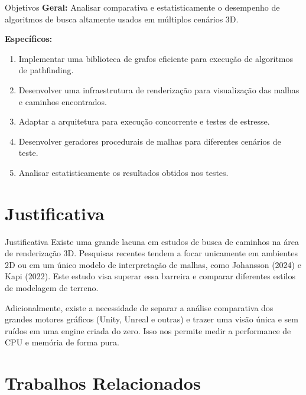 \documentclass[11pt]{beamer}
\begin{document}
\begin{frame}{Objetivos}
    \textbf{Geral:} Analisar comparativa e estatisticamente o desempenho de algoritmos de busca altamente usados em múltiplos cenários 3D.
    \vspace{1.5em}

    \textbf{Específicos:}
    \begin{enumerate}
        \item Implementar uma biblioteca de grafos eficiente para execução de algoritmos de pathfinding.
        \item Desenvolver uma infraestrutura de renderização para visualização das malhas e caminhos encontrados.
        \item Adaptar a arquitetura para execução concorrente e testes de estresse.
        \item Desenvolver geradores procedurais de malhas para diferentes cenários de teste.
        \item Analisar estatisticamente os resultados obtidos nos testes.
    \end{enumerate}
\end{frame}

\section{Justificativa}

\begin{frame}{Justificativa}
    Existe uma grande lacuna em estudos de busca de caminhos na área de renderização 3D. Pesquisas recentes tendem a focar unicamente em ambientes 2D ou em um único modelo de interpretação de malhas, como Johansson (2024)\cite{johansson2024adapting} e Kapi (2022)\cite{Kapi2022}. Este estudo visa superar essa barreira e comparar diferentes estilos de modelagem de terreno.
    \vspace{1.5em}
    
    Adicionalmente, existe a necessidade de separar a análise comparativa dos grandes motores gráficos (Unity, Unreal e outras) e trazer uma visão única e sem ruídos em uma engine criada do zero. Isso nos permite medir a performance de CPU e memória de forma pura.
\end{frame}

\section{Trabalhos Relacionados}
\end{document}

